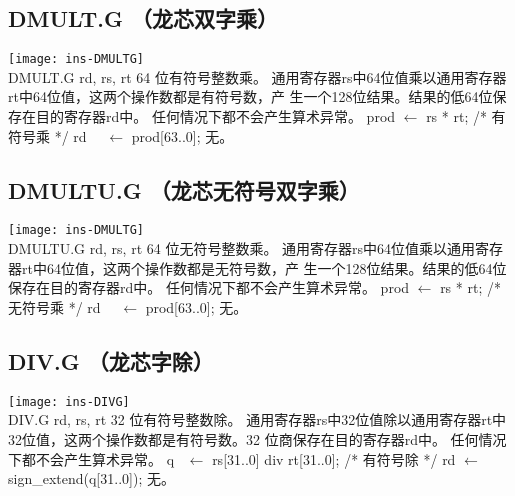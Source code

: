 
\subsection{DMULT.G （龙芯双字乘）}

\begin{instructionblk}
  \texttt{[image: ins-DMULTG]} \\
  \instructionbody
  {DMULT.G rd, rs, rt}
  {64 位有符号整数乘。}
  {通用寄存器rs中64位值乘以通用寄存器rt中64位值，这两个操作数都是有符号数，产
  生一个128位结果。结果的低64位保存在目的寄存器rd中。 \fldnewline
  任何情况下都不会产生算术异常。}
  {prod $\leftarrow$ rs * rt; /* 有符号乘 */ \newline
  rd~~ $\leftarrow$ prod[63..0];}
  {无。}
\end{instructionblk}


\subsection{DMULTU.G （龙芯无符号双字乘）}

\begin{instructionblk}
  \texttt{[image: ins-DMULTG]} \\
  \instructionbody
  {DMULTU.G rd, rs, rt}
  {64 位无符号整数乘。}
  {通用寄存器rs中64位值乘以通用寄存器rt中64位值，这两个操作数都是无符号数，产
  生一个128位结果。结果的低64位保存在目的寄存器rd中。\fldnewline
  任何情况下都不会产生算术异常。}
  {prod $\leftarrow$ rs * rt; /* 无符号乘 */ \newline
  rd~~ $\leftarrow$ prod[63..0];}
  {无。}
\end{instructionblk}

\subsection{DIV.G （龙芯字除）}

\begin{instructionblk}
  \texttt{[image: ins-DIVG]} \\
  \instructionbody
  {DIV.G rd, rs, rt}
  {32 位有符号整数除。}
  {通用寄存器rs中32位值除以通用寄存器rt中32位值，这两个操作数都是有符号数。32
  位商保存在目的寄存器rd中。 \fldnewline
  任何情况下都不会产生算术异常。}
  {q~ $\leftarrow$ rs[31..0] div rt[31..0]; /* 有符号除 */ \newline
  rd $\leftarrow$ sign\_extend(q[31..0]);}
  {无。}
\end{instructionblk}

